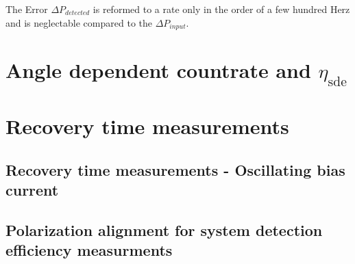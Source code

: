 The Error  $\Delta P_{detected} $ is reformed to a rate only in the order of a few hundred Herz and
is neglectable compared to the  $\Delta P_{input}$.


\section{Angle dependent countrate and $\eta_{\text{sde}}$ }\label{sec:ND_filter_calibration}

\begin{center}
    
\end{center}
\section{Recovery time measurements}\label{sec:Recovery time measurements}

\subsection{Recovery time measurements - Oscillating bias current} \label{subsec:recovery-time-measurements---oscillating_bias_current}
\subsection{Polarization alignment for system detection efficiency measurments} \label{subsec:polarization_alignment_for_system_detection_efficiency_measurments}

